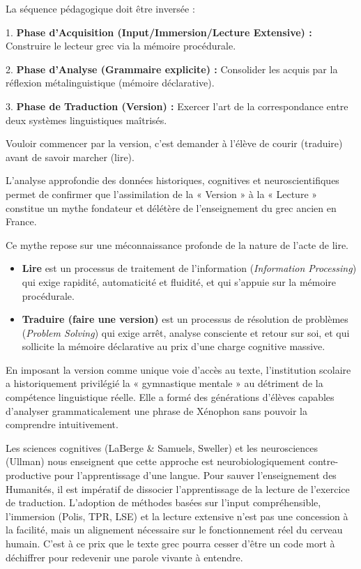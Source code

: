 La séquence pédagogique doit être inversée :

1. \textbf{Phase d'Acquisition (Input/Immersion/Lecture Extensive) :} Construire le lecteur grec via
la mémoire procédurale.

2. \textbf{Phase d'Analyse (Grammaire explicite) :} Consolider les acquis par la réflexion
métalinguistique (mémoire déclarative).

3. \textbf{Phase de Traduction (Version) :} Exercer l'art de la correspondance entre deux systèmes
linguistiques maîtrisés.

Vouloir commencer par la version, c'est demander à l'élève de courir (traduire) avant de savoir
marcher (lire).

L'analyse approfondie des données historiques, cognitives et neuroscientifiques permet de confirmer
que l'assimilation de la « Version » à la « Lecture » constitue un mythe fondateur et délétère de
l'enseignement du grec ancien en France.

Ce mythe repose sur une méconnaissance profonde de la nature de l'acte de lire.

\begin{itemize}\item \textbf{Lire} est un processus de traitement de l'information (\textit{Information Processing}) qui exige rapidité, automaticité et fluidité, et qui s'appuie sur la mémoire procédurale.\item \textbf{Traduire (faire une version)} est un processus de résolution de problèmes (\textit{Problem Solving}) qui exige arrêt, analyse consciente et retour sur soi, et qui sollicite la mémoire déclarative au prix d'une charge cognitive massive.\end{itemize}En imposant la version comme unique voie d'accès au texte, l'institution scolaire a historiquement
privilégié la « gymnastique mentale » au détriment de la compétence linguistique réelle. Elle a
formé des générations d'élèves capables d'analyser grammaticalement une phrase de Xénophon sans
pouvoir la comprendre intuitivement.

Les sciences cognitives (LaBerge \& Samuels, Sweller) et les neurosciences (Ullman) nous enseignent
que cette approche est neurobiologiquement contre-productive pour l'apprentissage d'une langue. Pour
sauver l'enseignement des Humanités, il est impératif de dissocier l'apprentissage de la lecture de
l'exercice de traduction. L'adoption de méthodes basées sur l'input compréhensible, l'immersion
(Polis, TPR, LSE) et la lecture extensive n'est pas une concession à la facilité, mais un alignement
nécessaire sur le fonctionnement réel du cerveau humain. C'est à ce prix que le texte grec pourra
cesser d'être un code mort à déchiffrer pour redevenir une parole vivante à entendre.

